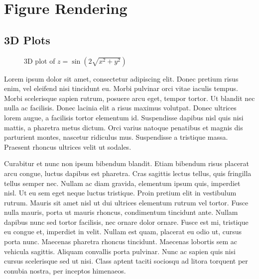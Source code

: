 \section{Figure Rendering}

\subsection{3D Plots}

\begin{figure}[h]
    \centering
    \caption{3D plot of $z = \sin(2\sqrt{x^2 + y^2})$}
\end{figure}

Lorem ipsum dolor sit amet, consectetur adipiscing elit. Donec pretium risus enim, vel eleifend nisi tincidunt eu. Morbi pulvinar orci vitae iaculis tempus. Morbi scelerisque sapien rutrum, posuere arcu eget, tempor tortor. Ut blandit nec nulla ac facilisis. Donec lacinia elit a risus maximus volutpat. Donec ultrices lorem augue, a facilisis tortor elementum id. Suspendisse dapibus nisl quis nisi mattis, a pharetra metus dictum. Orci varius natoque penatibus et magnis dis parturient montes, nascetur ridiculus mus. Suspendisse a tristique massa. Praesent rhoncus ultrices velit ut sodales.

Curabitur et nunc non ipsum bibendum blandit. Etiam bibendum risus placerat arcu congue, luctus dapibus est pharetra. Cras sagittis lectus tellus, quis fringilla tellus semper nec. Nullam ac diam gravida, elementum ipsum quis, imperdiet nisl. Ut eu sem eget neque luctus tristique. Proin pretium elit in vestibulum rutrum. Mauris sit amet nisl ut dui ultrices elementum rutrum vel tortor. Fusce nulla mauris, porta ut mauris rhoncus, condimentum tincidunt ante. Nullam dapibus nunc sed tortor facilisis, nec ornare dolor ornare. Fusce est mi, tristique eu congue et, imperdiet in velit. Nullam est quam, placerat eu odio ut, cursus porta nunc. Maecenas pharetra rhoncus tincidunt. Maecenas lobortis sem ac vehicula sagittis. Aliquam convallis porta pulvinar. Nunc ac sapien quis nisi cursus scelerisque sed ut nisi. Class aptent taciti sociosqu ad litora torquent per conubia nostra, per inceptos himenaeos.

